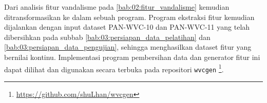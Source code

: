 Dari analisis fitur vandalisme pada \ref{bab:02:fitur_vandalisme} kemudian
ditransformasikan ke dalam sebuah program.
Program ekstraksi fitur kemudian dijalankan dengan input dataset PAN-WVC-10
dan PAN-WVC-11 yang telah dibersihkan pada subbab
\ref{bab:03:persiapan_data_pelatihan} dan
\ref{bab:03:persiapan_data_pengujian},
sehingga menghasilkan dataset fitur yang bernilai kontinu.
Implementasi program pembersihan data dan generator fitur ini dapat dilihat dan
digunakan secara terbuka pada repositori \texttt{wvcgen}
\footnote{\url{https://github.com/shuLhan/wvcgen}}.
